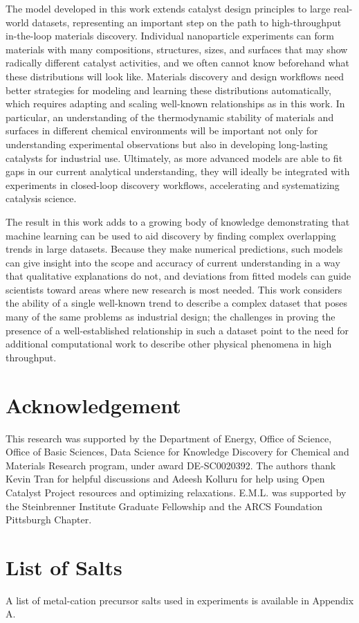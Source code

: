 \documentclass[preprint,12pt]{elsarticle}
\begin{document}
The model developed in this work extends catalyst design principles to large real-world datasets, representing an important step on the path to high-throughput in-the-loop materials discovery. Individual nanoparticle experiments can form materials with many compositions, structures, sizes, and surfaces that may show radically different catalyst activities, and we often cannot know beforehand what these distributions will look like. Materials discovery and design workflows need better strategies for modeling and learning these distributions automatically, which requires adapting and scaling well-known relationships as in this work. In particular, an understanding of the thermodynamic stability of materials and surfaces in different chemical environments will be important not only for understanding experimental observations but also in developing long-lasting catalysts for industrial use. Ultimately, as more advanced models are able to fit gaps in our current analytical understanding, they will ideally be integrated with experiments in closed-loop discovery workflows, accelerating and systematizing catalysis science.

The result in this work adds to a growing body of knowledge demonstrating that machine learning can be used to aid discovery by finding complex overlapping trends in large datasets. Because they make numerical predictions, such models can give insight into the scope and accuracy of current understanding in a way that qualitative explanations do not, and deviations from fitted models can guide scientists toward areas where new research is most needed. This work considers the ability of a single well-known trend to describe a complex dataset that poses many of the same problems as industrial design; the challenges in proving the presence of a well-established relationship in such a dataset point to the need for additional computational work to describe other physical phenomena in high throughput.


\section{Acknowledgement}
This research was supported by the Department of Energy, Office of Science, Office of Basic Sciences, Data Science for Knowledge Discovery for Chemical and Materials Research program, under award DE-SC0020392. The authors thank Kevin Tran for helpful discussions and Adeesh Kolluru for help using Open Catalyst Project resources and optimizing relaxations. E.M.L. was supported by the Steinbrenner Institute Graduate Fellowship and the ARCS Foundation Pittsburgh Chapter.

\appendix

\section{List of Salts}
\label{Section:Salts}
A list of metal-cation precursor salts used in experiments is available in Appendix A. 

  
 
\end{document}

